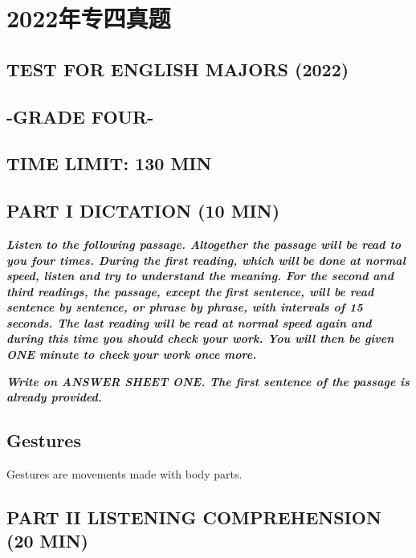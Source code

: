 \documentclass[UTF8,11pt]{ctexart}
\begin{document}
\section*{2022年专四真题}
\subsection*{\textbf{TEST} \textbf{FOR} \textbf{ENGLISH} \textbf{MAJORS (2022)}}


\subsection*{\textbf{-GRADE} \textbf{FOUR-}}


\subsection*{\textbf{TIME LIMIT: 130 MIN}}


\subsection*{\textbf{PART} \textbf{I DICTATION (10 MIN})}


\textbf{\textit{Listen to the following passage. Altogether the passage will be read to you four times. During the first reading, which will}} \textbf{\textit{be done at normal speed, listen and try to understand the meaning. For the second and third readings, the passage, except the}} \textbf{\textit{first sentence, will be read sentence by sentence, or phrase by phrase, with intervals of 15 seconds. The last reading will be}} \textbf{\textit{read at normal speed again and during this time you should check your work. You will then be given ONE minute to check}} \textbf{\textit{your work once more.}}


\textbf{\textit{Write on ANSWER SHEET ONE. The first sentence of the passage is already provided.}}


\subsection*{\textbf{Gestures}}


Gestures are movements made with body parts.


\subsection*{\textbf{PART} \textbf{II LISTENING COMPREHENSION (20 MIN})}
\end{document}
